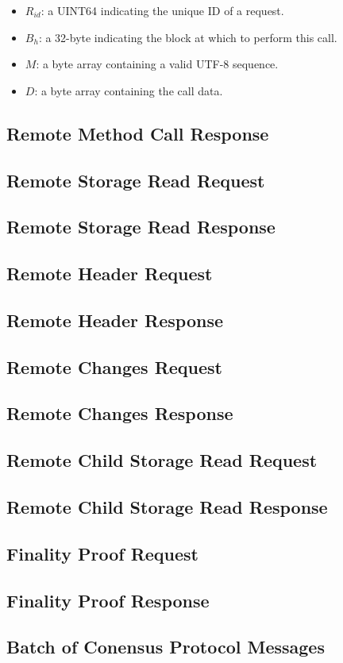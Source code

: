 \documentclass{book}
\begin{document}
\begin{itemize}
    \item $R_{id}$: a UINT64 indicating the unique ID of a request.
    \item $B_h$: a 32-byte indicating the block at which to perform this call.
    \item $M$: a byte array containing a valid UTF-8 sequence.
    \item $D$: a byte array containing the call data.
\end{itemize}

\subsection{Remote Method Call Response}

\subsection{Remote Storage Read Request}

\subsection{Remote Storage Read Response}

\subsection{Remote Header Request}

\subsection{Remote Header Response}

\subsection{Remote Changes Request}

\subsection{Remote Changes Response}

\subsection{Remote Child Storage Read Request}

\subsection{Remote Child Storage Read Response}

\subsection{Finality Proof Request}

\subsection{Finality Proof Response}

\subsection{Batch of Conensus Protocol Messages}
\end{document}
